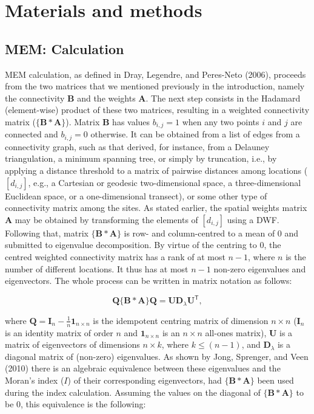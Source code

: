 \documentclass[
]{article}
\begin{document}
\section{Materials and methods}\label{materials-and-methods}

\subsection{MEM: Calculation}\label{mem-calculation}

MEM calculation, as defined in Dray, Legendre, and Peres-Neto (2006),
proceeds from the two matrices that we mentioned previously in the
introduction, namely the connectivity \(\mathbf{B}\) and the weights
\(\mathbf{A}\). The next step consists in the Hadamard (element-wise)
product of these two matrices, resulting in a weighted connectivity
matrix (\(\{\mathbf{B*A}\}\)). Matrix \(\mathbf{B}\) has values
\(b_{i,j} = 1\) when any two points \(i\) and \(j\) are connected and
\(b_{i,j} = 0\) otherwise. It can be obtained from a list of edges from
a connectivity graph, such as that derived, for instance, from a
Delauney triangulation, a minimum spanning tree, or simply by
truncation, i.e., by applying a distance threshold to a matrix of
pairwise distances among locations (\([d_{i,j}]\), e.g., a Cartesian or
geodesic two-dimensional space, a three-dimensional Euclidean space, or
a one-dimensional transect), or some other type of connectivity matrix
among the sites. As stated earlier, the spatial weights matrix
\(\mathbf{A}\) may be obtained by transforming the elements of
\([d_{i,j}]\) using a DWF. Following that, matrix \(\{\mathbf{B*A}\}\)
is row- and column-centred to a mean of \(0\) and submitted to
eigenvalue decomposition. By virtue of the centring to \(0\), the
centred weighted connectivity matrix has a rank of at most \(n - 1\),
where \(n\) is the number of different locations. It thus has at most
\(n - 1\) non-zero eigenvalues and eigenvectors. The whole process can
be written in matrix notation as follows:

\[
\mathbf{Q} \{\mathbf{B} * \mathbf{A}\} \mathbf{Q} = \mathbf{U}\mathbf{D}_\lambda\mathbf{U}^\mathsf{T},
\label{eq1}\tag{1}
\]

where
\(\mathbf{Q} = \mathbf{I}_{n} - \frac{1}{n} \mathbf{1}_{n \times n}\) is
the idempotent centring matrix of dimension \(n \times n\)
(\(\mathbf{I}_n\) is an identity matrix of order \(n\) and
\(\mathbf{1}_{n \times n}\) is an \(n \times n\) all-ones matrix),
\(\mathbf{U}\) is a matrix of eigenvectors of dimensions \(n \times k\),
where \(k \leq (n - 1)\), and \(\mathbf{D}_\lambda\) is a diagonal
matrix of (non-zero) eigenvalues. As shown by Jong, Sprenger, and Veen
(2010) there is an algebraic equivalence between these eigenvalues and
the Moran's index (\(I\)) of their corresponding eigenvectors, had
\(\{\mathbf{B*A}\}\) been used during the index calculation. Assuming
the values on the diagonal of \(\{\mathbf{B*A}\}\) to be \(0\), this
equivalence is the following:
\end{document}
